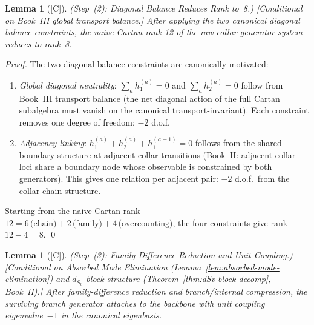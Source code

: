 \documentclass[12pt,oneside]{amsbook}
\theoremstyle{plain}
\newtheorem{lemma}[theorem]{Lemma}
\theoremstyle{definition}
\theoremstyle{remark}
\newcommand{\status}[1]{\textup{[#1]}}
\begin{document}
\begin{lemma}[\status{C}]\label{lem:diagonal-balance}
\textup{(Step~(2): Diagonal Balance Reduces Rank to~8.)}
\textup{[Conditional on Book~III global transport balance.]}
After applying the two canonical diagonal balance constraints,
the naive Cartan rank 12 of the raw collar-generator system
reduces to rank~8.
\end{lemma}

\begin{proof}
The two diagonal balance constraints are canonically motivated:
\begin{enumerate}[label=\textup{(\arabic*)}]
 \item \emph{Global diagonal neutrality}: $\sum_a h_1^{(a)} = 0$
 and $\sum_a h_2^{(a)} = 0$ follow from Book~III transport
 balance (the net diagonal action of the full Cartan
 subalgebra must vanish on the canonical transport-invariant).
 Each constraint removes one degree of freedom: $-2$ d.o.f.
 \item \emph{Adjacency linking}: $h_1^{(a)} + h_2^{(a)} +
 h_1^{(a+1)} = 0$ follows from the shared boundary structure
 at adjacent collar transitions (Book~II: adjacent collar
 loci share a boundary node whose observable is constrained
 by both generators). This gives one relation per adjacent
 pair: $-2$ d.o.f.\ from the collar-chain structure.
\end{enumerate}
Starting from the naive Cartan rank $12 = 6\,\text{(chain)}
+ 2\,\text{(family)} + 4\,\text{(overcounting)}$, the four
constraints give rank $12 - 4 = 8$. \qed
\end{proof}

\begin{lemma}[\status{C}]\label{lem:family-difference-reduction}
\textup{(Step~(3): Family-Difference Reduction and Unit Coupling.)}
\textup{[Conditional on Absorbed Mode Elimination
(Lemma~\ref{lem:absorbed-mode-elimination}) and $d_{S_v}$-block
structure (Theorem~\ref{thm:dSv-block-decomp}, Book~II).]}
After family-difference reduction and branch/internal compression,
the surviving branch generator attaches to the backbone with
unit coupling eigenvalue~$-1$ in the canonical eigenbasis.
\end{lemma}
\end{document}
